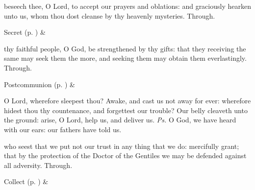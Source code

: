 \secret
{} beseech thee, O Lord, to accept our prayers and oblations: and graciously hearken unto us, whom thou dost cleanse by thy heavenly mysteries. Through.
\begin{rubric}
     Secret  (p. \pageref{SPSaints}) \&  
\end{rubric}


\postcommunion
{} thy faithful people, O God, be strengthened by thy gifts: that they receiving the same may seek them the more, and seeking them may obtain them everlastingly. Through.
\begin{rubric}
     Postcommunion  (p. \pageref{SPSaints}) \&  
\end{rubric}




\introit
{} O Lord, wherefore sleepest thou? Awake, and cast us not away for ever: wherefore hidest thou thy countenance, and forgettest our trouble? Our belly cleaveth unto the ground: arise, O Lord, help us, and deliver us. \textit{Ps.} O God, we have heard with our ears: our fathers have told us.

\collect
{} who seest that we put not our trust in any thing that we do: mercifully grant; that by the protection of the Doctor of the Gentiles we may be defended against all adversity. Through.

\begin{rubric}
     Collect  (p. \pageref{SPSaints}) \&  
\end{rubric}


